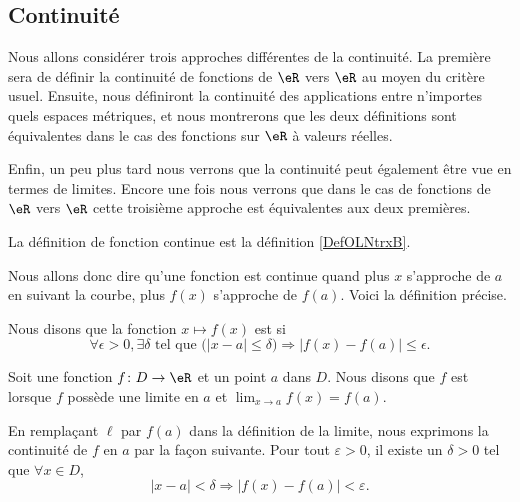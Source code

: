 
\subsection{Continuité}

Nous allons considérer trois approches différentes de la continuité. La première sera de définir la continuité de fonctions de $\eR$ vers $\eR$ au moyen du critère usuel. Ensuite, nous définiront la continuité des applications entre n'importes quels espaces métriques, et nous montrerons que les deux définitions sont équivalentes dans le cas des fonctions sur $\eR$ à valeurs réelles.

Enfin, un peu plus tard nous verrons que la continuité peut également être vue en termes de limites. Encore une fois nous verrons que dans le cas de fonctions de $\eR$ vers $\eR$ cette troisième approche est équivalentes aux deux premières.


La définition de fonction continue est la définition \ref{DefOLNtrxB}.


Nous allons donc dire qu'une fonction est continue quand plus $x$ s'approche de $a$ en suivant la courbe, plus $f(x)$ s'approche de $f(a)$. Voici la définition précise.
\begin{definition}      \label{DefContinue}
Nous disons que la fonction $x\mapsto f(x)$ est  si
\begin{equation}
 \forall \epsilon>0,\exists \delta\text{ tel que } \big(| x-a |\leq\delta\big)\Rightarrow | f(x)-f(a) |\leq \epsilon.
\end{equation}
\end{definition}


\begin{definition}		\label{DefFonctContinueRR}
	Soit une fonction $f\colon D\to \eR$ et un point $a$ dans $D$. Nous disons que $f$ est  lorsque $f$ possède une limite en $a$ et $\lim_{x\to a} f(x)=f(a)$.
\end{definition}
En remplaçant $\ell$ par $f(a)$ dans la définition de la limite, nous exprimons la continuité de $f$ en $a$ par la façon suivante. Pour tout $\varepsilon>0$, il existe un $\delta>0$ tel que $\forall x\in D$,
\begin{equation}
	| x-a |<\delta\Rightarrow \big| f(x)-f(a) \big|<\varepsilon.
\end{equation}


